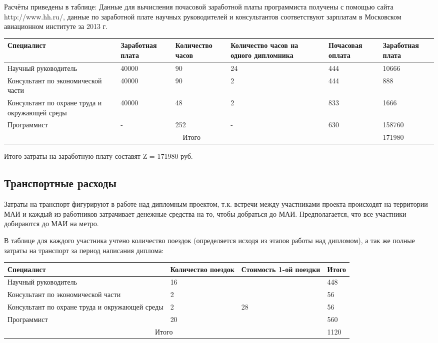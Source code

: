Расчёты приведены в таблице: Данные для вычисления почасовой зара\-ботной платы программиста получены с помощью сайта http://www.hh.ru/, данные по заработной плате научных руководителей и консультантов соот\-ветствуют зарплатам в Московском авиационном институте за 2013 г.
\begin{table}[H]
\begin{center}
\begin{tabular}{|p{3.5cm}|p{1.8cm}|p{1.6cm}|p{2.8cm}|p{2.1cm}|p{1.8cm}|}
\hline
Специалист&
Заработ\-ная плата&
Коли\-чество часов &
Количество часов на одного дипломника&
Почасовая оплата&
Заработ\-ная плата\\
\hline
Научный руководитель&
40000&
90&
24&
444&
10666\\
\hline
Консультант по экономической части&
40000&
90&
2&
444&
888\\
\hline
Консультант по охране труда и окружающей среды&
40000&
48&
2&
833&
1666\\
\hline
Программист&
-&
252&
-&
630&
158760\\
\hline
\multicolumn{5}{|c|}{Итого}&
171980\\
\hline
\end{tabular}
\end{center}
\end{table}

Итого затраты на заработную плату составят Z = 171980 руб.

\subsection{Транспортные расходы}

Затраты на транспорт фигурируют в работе над дипломным проектом, т.к. встречи между участниками проекта происходят на территории МАИ и каждый из работников затрачивает денежные средства на то, чтобы добраться до МАИ. Предполагается, что все участники добираются до МАИ на метро.

В таблице для каждого участника учтено количество поездок (определяется исходя из этапов работы над дипломом), а так же полные затраты на транспорт за период написания диплома:
\begin{table}[H]
\begin{center}
\begin{tabular}{|p{3.5cm}|p{2.8cm}|p{2.6cm}|p{2.8cm}|}
\hline
Специалист&
Количество поездок&
Стоимость 1-ой поездки&
Итого\\
\hline
Научный руководитель&
16&
&
448\\
\cline{1-2}\cline{4-4}
Консультант по экономической части&
2&
&

56
\\
\cline{1-2}\cline{4-4}
Консультант по охране труда и окружающей среды&
2&
28
&
56
\\
\cline{1-2}\cline{4-4}
Программист&
20&
&
560\\
\hline
\multicolumn{3}{|c|}{Итого}&
1120\\
\hline
\end{tabular}
\end{center}
\end{table}

